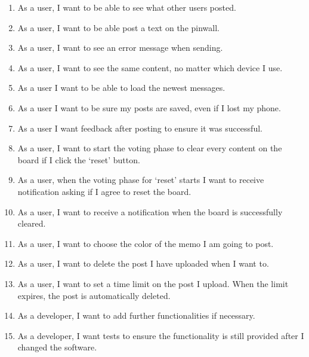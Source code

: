 \documentclass[conference]{IEEEtran}
\numberwithin{figure}{subsection}
\begin{document}
\begin{enumerate}
 \item As a user, I want to be able to see what other users posted.
 \newline
 \item As a user, I want to be able post a text on the pinwall.
 \newline
 \item As a user, I want to see an error message when sending.
 \newline
 \item As a user, I want to see the same content, no matter which device I use.
 \newline
 \item As a user I want to be able to load the newest messages.
 \newline
 \item As a user I want to be sure my posts are saved, even if I lost my phone.
 \newline
 \item As a user I want feedback after posting to ensure it was successful.
 \newline
 \item As a user, I want to start the voting phase to clear every content on the board if I click the ‘reset’ button.
 \newline
 \item As a user, when the voting phase for ‘reset’ starts I want to receive notification asking if I agree to reset the board. 
 \newline
 \item As a user, I want to receive a notification when the board is successfully cleared.
 \newline
 \item As a user, I want to choose the color of the memo I am going to post.
 \newline
 \item As a user, I want to delete the post I have uploaded when I want to. 
 \newline
 \item As a user, I want to set a time limit on the post I upload. When the limit expires, the post is automatically deleted. 
 \newline
 \item As a developer, I want to add further functionalities if necessary.
 \newline
 \item As a developer, I want tests to ensure the functionality is still provided after I changed the software.
 \newline
 \end{enumerate}
\end{document}

